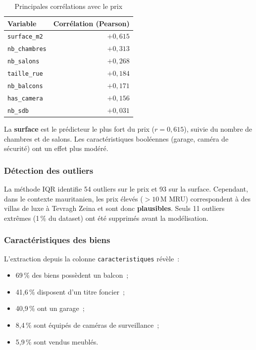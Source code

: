 \documentclass[12pt, a4paper]{article}
\begin{document}
\begin{table}[H]
\centering
\caption{Principales corrélations avec le prix}
\label{tab:correlations}
\begin{tabular}{lr}
\toprule
\textbf{Variable} & \textbf{Corrélation (Pearson)} \\
\midrule
\texttt{surface\_m2} & $+0,615$ \\
\texttt{nb\_chambres} & $+0,313$ \\
\texttt{nb\_salons} & $+0,268$ \\
\texttt{taille\_rue} & $+0,184$ \\
\texttt{nb\_balcons} & $+0,171$ \\
\texttt{has\_camera} & $+0,156$ \\
\texttt{nb\_sdb} & $+0,031$ \\
\bottomrule
\end{tabular}
\end{table}

La \textbf{surface} est le prédicteur le plus fort du prix ($r = 0,615$), suivie du nombre de chambres et de salons. Les caractéristiques booléennes (garage, caméra de sécurité) ont un effet plus modéré.

\subsubsection{Détection des outliers}

La méthode IQR identifie 54 outliers sur le prix et 93 sur la surface. Cependant, dans le contexte mauritanien, les prix élevés ($> 10$\,M MRU) correspondent à des villas de luxe à Tevragh Zeina et sont donc \textbf{plausibles}. Seuls 11 outliers extrêmes (1\,\% du dataset) ont été supprimés avant la modélisation.

\subsubsection{Caractéristiques des biens}

L'extraction depuis la colonne \texttt{caracteristiques} révèle~:
\begin{itemize}
    \item 69\,\% des biens possèdent un balcon~;
    \item 41,6\,\% disposent d'un titre foncier~;
    \item 40,9\,\% ont un garage~;
    \item 8,4\,\% sont équipés de caméras de surveillance~;
    \item 5,9\,\% sont vendus meublés.
\end{itemize}
\end{document}
